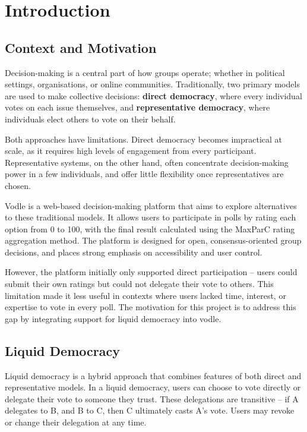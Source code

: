 \chapter{Introduction}\label{ch:introduction}

\section{Context and Motivation}

Decision-making is a central part of how groups operate; whether in political settings, organisations, or online communities. Traditionally, two primary models are used to make collective decisions: \textbf{direct democracy}, where every individual votes on each issue themselves, and \textbf{representative democracy}, where individuals elect others to vote on their behalf.

Both approaches have limitations. Direct democracy becomes impractical at scale, as it requires high levels of engagement from every participant. Representative systems, on the other hand, often concentrate decision-making power in a few individuals, and offer little flexibility once representatives are chosen.

Vodle is a web-based decision-making platform that aims to explore alternatives to these traditional models. It allows users to participate in polls by rating each option from 0 to 100, with the final result calculated using the MaxParC rating aggregation method. The platform is designed for open, consensus-oriented group decisions, and places strong emphasis on accessibility and user control.

However, the platform initially only supported direct participation -- users could submit their own ratings but could not delegate their vote to others. This limitation made it less useful in contexts where users lacked time, interest, or expertise to vote in every poll. The motivation for this project is to address this gap by integrating support for liquid democracy into vodle.

\section{Liquid Democracy}

Liquid democracy is a hybrid approach that combines features of both direct and representative models. In a liquid democracy, users can choose to vote directly or delegate their vote to someone they trust. These delegations are transitive -- if A delegates to B, and B to C, then C ultimately casts A's vote. Users may revoke or change their delegation at any time.

